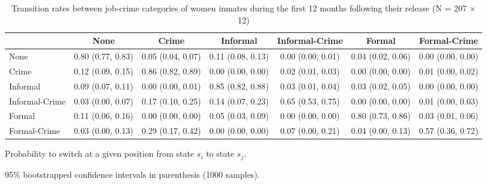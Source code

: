 \begin{table}[htp]
\scriptsize
\setlength{\tabcolsep}{10pt}
\renewcommand{\arraystretch}{1.3}
\begin{threeparttable}
\centering
\caption{Transition rates between job-crime categories of women inmates \newline
    during the first 12 months following their release (N = 207 $\times$ 12)} 
\label{tab:transition_rates_job_crime}
\begin{tabular}{lcccccc}
  \hline
 & None & Crime & Informal & Informal-Crime & Formal & Formal-Crime \\ 
  \hline
None & 0.80 (0.77, 0.83) & 0.05 (0.04, 0.07) & 0.11 (0.08, 0.13) & 0.00 (0.00, 0.01) & 0.04 (0.02, 0.06) & 0.00 (0.00, 0.00) \\ 
  Crime & 0.12 (0.09, 0.15) & 0.86 (0.82, 0.89) & 0.00 (0.00, 0.00) & 0.02 (0.01, 0.03) & 0.00 (0.00, 0.00) & 0.01 (0.00, 0.02) \\ 
  Informal & 0.09 (0.07, 0.11) & 0.00 (0.00, 0.01) & 0.85 (0.82, 0.88) & 0.03 (0.01, 0.04) & 0.03 (0.02, 0.05) & 0.00 (0.00, 0.00) \\ 
  Informal-Crime & 0.03 (0.00, 0.07) & 0.17 (0.10, 0.25) & 0.14 (0.07, 0.23) & 0.65 (0.53, 0.75) & 0.00 (0.00, 0.00) & 0.01 (0.00, 0.03) \\ 
  Formal & 0.11 (0.06, 0.16) & 0.00 (0.00, 0.00) & 0.05 (0.03, 0.09) & 0.00 (0.00, 0.00) & 0.80 (0.73, 0.86) & 0.03 (0.01, 0.06) \\ 
  Formal-Crime & 0.03 (0.00, 0.13) & 0.29 (0.17, 0.42) & 0.00 (0.00, 0.00) & 0.07 (0.00, 0.21) & 0.04 (0.00, 0.13) & 0.57 (0.36, 0.72) \\ 
   \hline
\end{tabular}
\begin{tablenotes}
\scriptsize
\item Probability to switch at a given position from state $s_i$ to state $s_j$. 
    \item 95\% bootstrapped confidence intervals in parenthesis (1000 samples).
\end{tablenotes}
\end{threeparttable}
\end{table}
